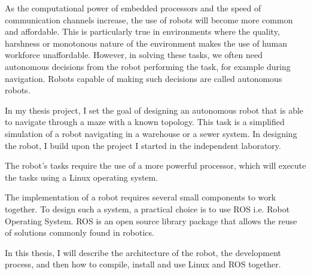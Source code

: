 As the computational power of embedded processors and the speed of communication channels increase, the use of robots will become more common and affordable. This is particularly true in environments where the quality, harshness or monotonous nature of the environment makes the use of human workforce unaffordable. However, in solving these tasks, we often need autonomous decisions from the robot performing the task, for example during navigation. Robots capable of making such decisions are called autonomous robots.

In my thesis project, I set the goal of designing an autonomous robot that is able to navigate through a maze with a known topology. This task is a simplified simulation of a robot navigating in a warehouse or a sewer system.  In designing the robot, I build upon the project I started in the independent laboratory.

The robot's tasks require the use of a more powerful processor,
which will execute the tasks using a Linux operating system.

The implementation of a robot requires several small components to work together. To design such a system, a practical choice is to use ROS i.e. Robot Operating System.  ROS is an open source library package that allows the reuse of solutions commonly found in robotics.

In this thesis, I will describe the architecture of the robot, the development process, and then how to compile, install and use Linux and ROS together.

\vfill
\selectthesislanguage

\setcounter{romanPage}{\value{page}}
